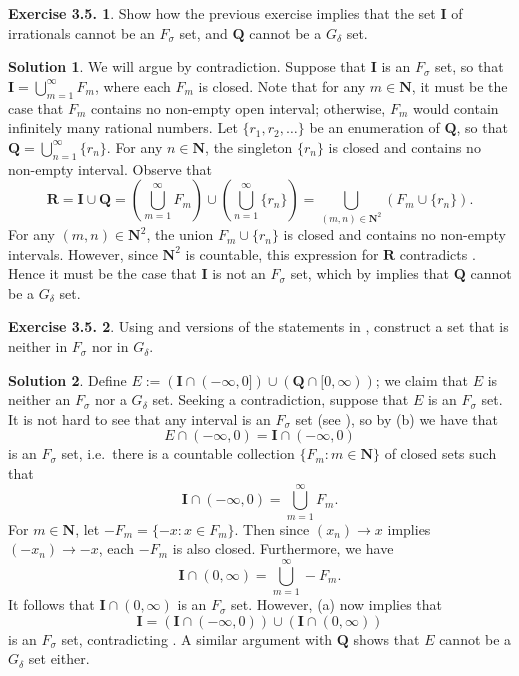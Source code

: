 \documentclass[12pt]{article}
\theoremstyle{definition}
\theoremstyle{exercise}
\newtheorem{exercise}{Exercise 3.5.}
\theoremstyle{solution}
\newtheorem*{solution}{Solution}
\newcommand{\N}{\mathbf{N}}
\newcommand{\Q}{\mathbf{Q}}
\newcommand{\I}{\mathbf{I}}
\newcommand{\R}{\mathbf{R}}
\begin{document}
\begin{exercise}
\label{ex:6}
    Show how the previous exercise implies that the set \( \I \) of irrationals cannot be an \( F_{\sigma} \) set, and \( \Q \) cannot be a \( G_{\delta} \) set.
\end{exercise}

\begin{solution}
    We will argue by contradiction. Suppose that \( \I \) is an \( F_{\sigma} \) set, so that \( \I = \bigcup_{m=1}^{\infty} F_m \), where each \( F_m \) is closed. Note that for any \( m \in \N \), it must be the case that \( F_m \) contains no non-empty open interval; otherwise, \( F_m \) would contain infinitely many rational numbers. Let \( \{ r_1, r_2, \ldots \} \) be an enumeration of \( \Q \), so that \( \Q = \bigcup_{n=1}^{\infty} \{ r_n \} \). For any \( n \in \N \), the singleton \( \{ r_n \} \) is closed and contains no non-empty interval. Observe that
    \[
        \R = \I \cup \Q = \left( \bigcup_{m=1}^{\infty} F_m \right) \cup \left( \bigcup_{n=1}^{\infty} \{ r_n \} \right) = \bigcup_{(m, n) \in \N^2} (F_m \cup \{ r_n \}).
    \]
    For any \( (m, n) \in \N^2 \), the union \( F_m \cup \{ r_n \} \) is closed and contains no non-empty intervals. However, since \( \N^2 \) is countable, this expression for \( \R \) contradicts . Hence it must be the case that \( \I \) is not an \( F_{\sigma} \) set, which by  implies that \( \Q \) cannot be a \( G_{\delta} \) set.
\end{solution}

\begin{exercise}
\label{ex:7}
    Using  and versions of the statements in , construct a set that is neither in \( F_{\sigma} \) nor in \( G_{\delta} \).
\end{exercise}

\begin{solution}
    Define \( E := (\I \cap (-\infty, 0]) \cup (\Q \cap [0, \infty)) \); we claim that \( E \) is neither an \( F_{\sigma} \) nor a \( G_{\delta} \) set. Seeking a contradiction, suppose that \( E \) is an \( F_{\sigma} \) set. It is not hard to see that any interval is an \( F_{\sigma} \) set (see ), so by  (b) we have that
    \[
        E \cap (-\infty, 0) = \I \cap (-\infty, 0)
    \]
    is an \( F_{\sigma} \) set, i.e.\ there is a countable collection \( \{ F_m : m \in \N \} \) of closed sets such that
    \[
        \I \cap (-\infty, 0) = \bigcup_{m=1}^{\infty} F_m.  
    \]
    For \( m \in \N \), let \( -F_m = \{ -x : x \in F_m \} \). Then since \( (x_n) \to x \) implies \( (-x_n) \to -x \), each \( -F_m \) is also closed. Furthermore, we have
    \[
        \I \cap (0, \infty) = \bigcup_{m=1}^{\infty} -F_m.
    \]
    It follows that \( \I \cap (0, \infty) \) is an \( F_{\sigma} \) set. However,  (a) now implies that
    \[
        \I = (\I \cap (-\infty, 0)) \cup (\I \cap (0, \infty))
    \]
    is an \( F_{\sigma} \) set, contradicting . A similar argument with \( \Q \) shows that \( E \) cannot be a \( G_{\delta} \) set either.
\end{solution}
\end{document}
